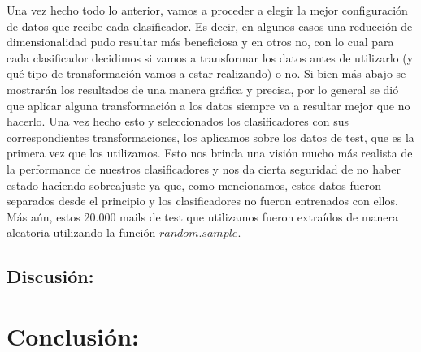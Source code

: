 \documentclass[a4paper]{article}
\begin{document}
Una vez hecho todo lo anterior, vamos a proceder a elegir la mejor configuración de datos que recibe cada clasificador. Es decir, en algunos casos una reducción de dimensionalidad pudo resultar más beneficiosa y en otros no, con lo cual para cada clasificador decidimos si vamos a transformar los datos antes de utilizarlo (y qué tipo de transformación vamos a estar realizando) o no. Si bien más abajo se mostrarán los resultados de una manera gráfica y precisa, por lo general se dió que aplicar alguna transformación a los datos siempre va a resultar mejor que no hacerlo. Una vez hecho esto y seleccionados los clasificadores con sus correspondientes transformaciones, los aplicamos sobre los datos de test, que es la primera vez que los utilizamos. Esto nos brinda una visión mucho más realista de la performance de nuestros clasificadores y nos da cierta seguridad de no haber estado haciendo sobreajuste ya que, como mencionamos, estos datos fueron separados desde el principio y los clasificadores no fueron entrenados con ellos. Más aún, estos 20.000 mails de test que utilizamos fueron extraídos de manera aleatoria utilizando la función $random.sample$.


\newpage

\subsection{Discusión:}



\newpage

\section{Conclusión:}
\end{document}
